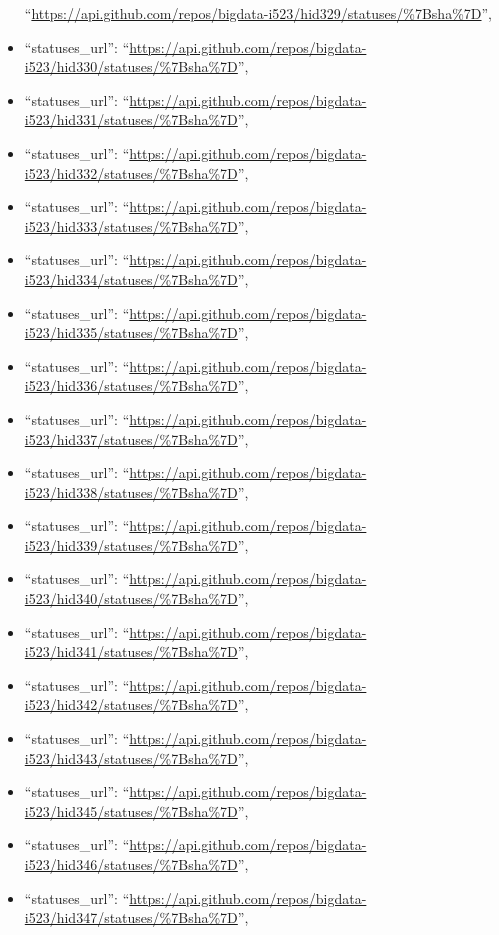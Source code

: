 \begin{itemize}
  ``\url{https://api.github.com/repos/bigdata-i523/hid329/statuses/\%7Bsha\%7D}'',
\item
  ``statuses\_url'':
  ``\url{https://api.github.com/repos/bigdata-i523/hid330/statuses/\%7Bsha\%7D}'',
\item
  ``statuses\_url'':
  ``\url{https://api.github.com/repos/bigdata-i523/hid331/statuses/\%7Bsha\%7D}'',
\item
  ``statuses\_url'':
  ``\url{https://api.github.com/repos/bigdata-i523/hid332/statuses/\%7Bsha\%7D}'',
\item
  ``statuses\_url'':
  ``\url{https://api.github.com/repos/bigdata-i523/hid333/statuses/\%7Bsha\%7D}'',
\item
  ``statuses\_url'':
  ``\url{https://api.github.com/repos/bigdata-i523/hid334/statuses/\%7Bsha\%7D}'',
\item
  ``statuses\_url'':
  ``\url{https://api.github.com/repos/bigdata-i523/hid335/statuses/\%7Bsha\%7D}'',
\item
  ``statuses\_url'':
  ``\url{https://api.github.com/repos/bigdata-i523/hid336/statuses/\%7Bsha\%7D}'',
\item
  ``statuses\_url'':
  ``\url{https://api.github.com/repos/bigdata-i523/hid337/statuses/\%7Bsha\%7D}'',
\item
  ``statuses\_url'':
  ``\url{https://api.github.com/repos/bigdata-i523/hid338/statuses/\%7Bsha\%7D}'',
\item
  ``statuses\_url'':
  ``\url{https://api.github.com/repos/bigdata-i523/hid339/statuses/\%7Bsha\%7D}'',
\item
  ``statuses\_url'':
  ``\url{https://api.github.com/repos/bigdata-i523/hid340/statuses/\%7Bsha\%7D}'',
\item
  ``statuses\_url'':
  ``\url{https://api.github.com/repos/bigdata-i523/hid341/statuses/\%7Bsha\%7D}'',
\item
  ``statuses\_url'':
  ``\url{https://api.github.com/repos/bigdata-i523/hid342/statuses/\%7Bsha\%7D}'',
\item
  ``statuses\_url'':
  ``\url{https://api.github.com/repos/bigdata-i523/hid343/statuses/\%7Bsha\%7D}'',
\item
  ``statuses\_url'':
  ``\url{https://api.github.com/repos/bigdata-i523/hid345/statuses/\%7Bsha\%7D}'',
\item
  ``statuses\_url'':
  ``\url{https://api.github.com/repos/bigdata-i523/hid346/statuses/\%7Bsha\%7D}'',
\item
  ``statuses\_url'':
  ``\url{https://api.github.com/repos/bigdata-i523/hid347/statuses/\%7Bsha\%7D}'',

\end{itemize}

